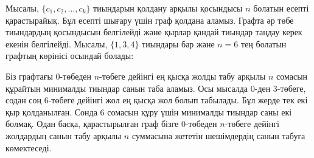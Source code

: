 Мысалы, $\{c_1,c_2,\ldots,c_k\}$ тиындарын қолдану арқылы
қосындысы $n$ болатын есепті қарастырайық.
Бұл есепті шығару үшін граф қолдана аламыз.
Графта әр төбе тиындардың қосындысын белгілейді және 
қырлар қандай тиындар таңдау керек екенін белгілейді.
Мысалы, $\{1,3,4\}$ тиындары бар және $n=6$ тең болатын графтың
көрінісі осындай болады:
\begin{center}
\end{center}

Біз графтағы 0-төбеден $n$-төбеге дейінгі ең қысқа жолды табу арқылы $n$ сомасын
құрайтын минималды тиындар санын таба аламыз. Осы мысалда 0-ден
3-төбеге, содан соң 6-төбеге дейінгі жол ең қысқа жол болып табылады. Бұл
жерде тек екі қыр қолданылған. Сонда 6 сомасын құру үшін 
минималды тиындар саны екі болмақ. Одан басқа, қарастырылған граф бізге
0-төбеден $n$-төбеге дейінгі жолдардың санын табу арқылы 
$n$ суммасына жететін шешімдердің санын табуға көмектеседі.

